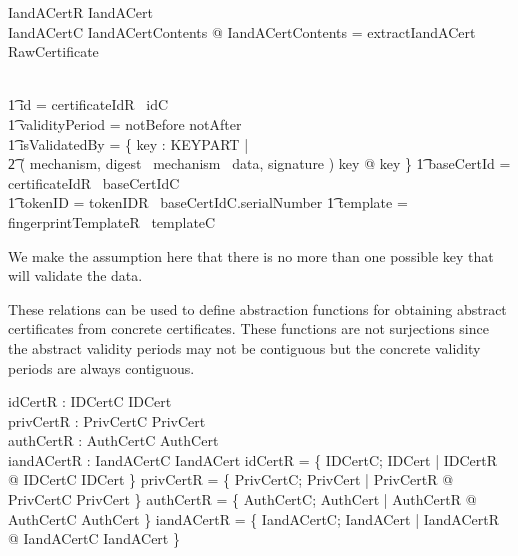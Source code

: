\begin{schema}{IandACertR}
        IandACert
\\      IandACertC
\where
        \exists IandACertContents @
        \theta IandACertContents = extractIandACert~ \theta RawCertificate

\\ \t1 \land id = certificateIdR~ idC
\\ \t1  \land validityPeriod = notBefore \upto notAfter
\\ \t1  \land isValidatedBy = \{ key : KEYPART |
\\ \t2   ( mechanism,
        digest~ mechanism~ data, signature ) \isVerifiedBy key @ key \}
\also
   \t1 \land baseCertId = certificateIdR~ baseCertIdC
\\ \t1  \land tokenID = tokenIDR~ baseCertIdC.serialNumber
\also
    \t1  \land template = fingerprintTemplateR~ templateC

\end{schema}
\begin{Zcomment}
\item
We make the assumption here that there is no more than one possible key that
will validate the data. 
\end{Zcomment}

These relations can be used to define abstraction functions for
obtaining abstract certificates from concrete certificates. These
functions are not surjections since the abstract validity periods may
not be contiguous but the concrete validity periods are always contiguous.

\begin{axdef}
        idCertR : IDCertC \fun  IDCert
\\      privCertR : PrivCertC \fun PrivCert
\\      authCertR : AuthCertC \fun AuthCert
\\      iandACertR : IandACertC \fun IandACert
\where
        idCertR = \{ IDCertC; IDCert | IDCertR @ 
        \theta IDCertC \mapsto \theta IDCert \} 
\also 
        privCertR = \{ PrivCertC; PrivCert | PrivCertR @ 
        \theta  PrivCertC \mapsto \theta PrivCert \} 
\also
        authCertR = \{ AuthCertC; AuthCert | AuthCertR @ 
        \theta  AuthCertC \mapsto \theta AuthCert \} 
\also
        iandACertR = \{ IandACertC; IandACert | IandACertR @ 
        \theta  IandACertC \mapsto \theta IandACert \} 
\end{axdef}


